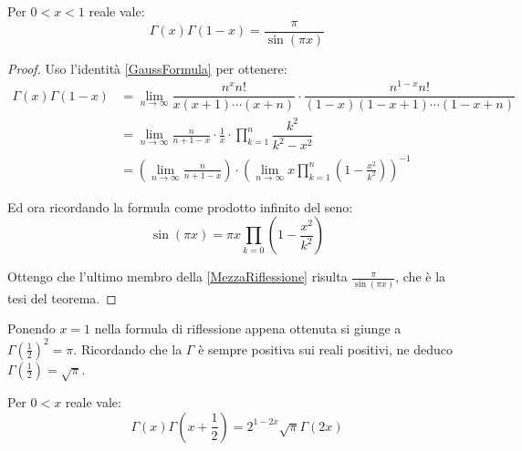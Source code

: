 \begin{theorem}
\label{Riflessione}
Per $0<x<1$ reale vale:
\begin{equation*}
	\Gamma(x)\Gamma(1-x)=\frac{\pi}{\sin(\pi x)}
\end{equation*}

\end{theorem}

\begin{proof}
Uso l'identità \ref{GaussFormula} per ottenere:
\begin{equation}
\label{MezzaRiflessione}
\begin{split}
\Gamma(x)\Gamma(1-x) & = \lim_{n\to\infty} \dfrac{n^xn!}{x(x+1)\cdots (x+n)} \cdot \dfrac{n^{1-x}n!}{(1-x)(1-x+1)\cdots (1-x+n)}\\
 & =\lim_{n\to\infty} \frac{n}{n+1-x} \cdot \frac{1}{x} \cdot \prod_{k=1}^{n}\dfrac{k^2}{k^2-x^2} \\
  & =\left(\lim_{n\to\infty} \frac{n}{n+1-x} \right) \cdot \left( \lim_{n\to\infty} x \prod_{k=1}^{n}\left(1-\frac{x^2}{k^2}\right) \right)^{-1}
\end{split}
\end{equation}

Ed ora ricordando la formula come prodotto infinito del seno:
\begin{equation*}
	\sin(\pi x)=\pi x \prod_{k=0} \left(1-\frac{x^2}{k^2}\right)
\end{equation*}

Ottengo che l'ultimo membro della \eqref{MezzaRiflessione} risulta $\frac{\pi}{\sin(\pi x)}$, che è la tesi del teorema.


\end{proof}

\begin{remark}
Ponendo $x=1$ nella formula di riflessione appena ottenuta si giunge a $\Gamma\left(\frac12\right)^2=\pi$. 
Ricordando che la $\Gamma$ è sempre positiva sui reali positivi, ne deduco $\Gamma\left(\frac12\right)=\sqrt\pi$.
\end{remark}


\begin{theorem}
\label{Duplicazione}
Per $0<x$ reale vale:
\begin{equation*}
	\Gamma(x)\Gamma\left(x+\frac12\right)=2^{1-2x}\sqrt{\pi}\Gamma(2x)
\end{equation*}

\end{theorem}

